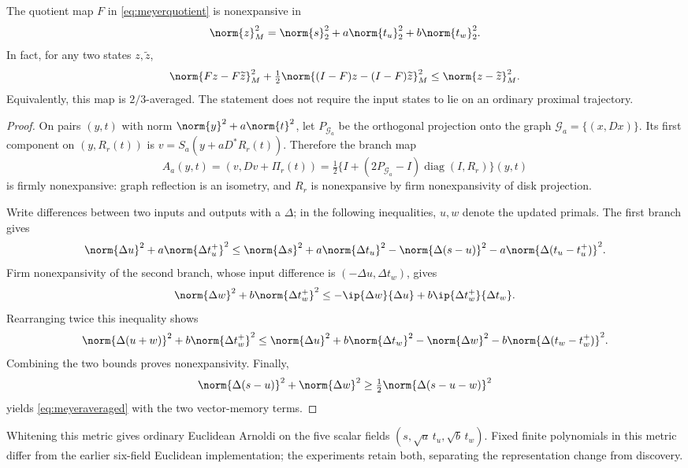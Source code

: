 \begin{theorem}\label{thm:meyermetric}
The quotient map $F$ in \eqref{eq:meyerquotient} is nonexpansive in
\begin{equation}
 \norm{z}_M^2=\norm{s}_2^2+a\norm{t_u}_2^2+b\norm{t_w}_2^2.
 \label{eq:meyermetric}
\end{equation}
In fact, for any two states $z,\widetilde z$,
\begin{equation}
 \norm{Fz-F\widetilde z}_M^2+
 \tfrac12\norm{(I-F)z-(I-F)\widetilde z}_M^2
 \leq\norm{z-\widetilde z}_M^2. \label{eq:meyeraveraged}
\end{equation}
Equivalently, this map is $2/3$-averaged. The statement does not require
the input states to lie on an ordinary proximal trajectory.
\end{theorem}
\begin{proof}
On pairs $(y,t)$ with norm $\norm{y}^2+a\norm{t}^2$, let $P_{\mathcal G_a}$
be the orthogonal projection onto the graph $\mathcal G_a=\{(x,Dx)\}$.
Its first component on $(y,R_r(t))$ is
$v=S_a(y+aD^*R_r(t))$. Therefore the branch map
\[
 A_a(y,t)=(v,Dv+\Pi_r(t))
 =\tfrac12\{I+(2P_{\mathcal G_a}-I)\operatorname{diag}(I,R_r)\}(y,t)
\]
is firmly nonexpansive: graph reflection is an isometry, and $R_r$ is
nonexpansive by firm nonexpansivity of disk projection.

Write differences between two inputs and outputs with a $\Delta$; in the
following inequalities, $u,w$ denote the updated primals.
The first branch gives
\[
 \norm{\Delta u}^2+a\norm{\Delta t_u^+}^2
 \leq\norm{\Delta s}^2+a\norm{\Delta t_u}^2
 -\norm{\Delta(s-u)}^2-a\norm{\Delta(t_u-t_u^+)}^2.
\]
Firm nonexpansivity of the second branch, whose input difference is
$(-\Delta u,\Delta t_w)$, gives
\[
 \norm{\Delta w}^2+b\norm{\Delta t_w^+}^2
 \leq-\ip{\Delta w}{\Delta u}+b\ip{\Delta t_w^+}{\Delta t_w}.
\]
Rearranging twice this inequality shows
\[
 \norm{\Delta(u+w)}^2+b\norm{\Delta t_w^+}^2
 \leq\norm{\Delta u}^2+b\norm{\Delta t_w}^2
 -\norm{\Delta w}^2-b\norm{\Delta(t_w-t_w^+)}^2.
\]
Combining the two bounds proves nonexpansivity. Finally,
\[
 \norm{\Delta(s-u)}^2+\norm{\Delta w}^2
 \geq\tfrac12\norm{\Delta(s-u-w)}^2
\]
yields \eqref{eq:meyeraveraged} with the two vector-memory terms.
\end{proof}

Whitening this metric gives ordinary Euclidean Arnoldi on the five scalar
fields $(s,\sqrt a\,t_u,\sqrt b\,t_w)$. Fixed finite polynomials in this
metric differ from the earlier six-field Euclidean implementation; the
experiments retain both, separating the representation change from discovery.

